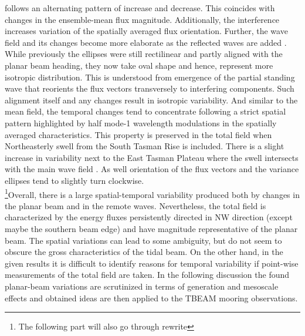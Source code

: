 \documentclass[12pt]{article}
\begin{document}
follows an alternating pattern of increase and decrease. This coincides with changes in the 
ensemble-mean flux magnitude. Additionally, the interference increases variation of the spatially 
averaged flux orientation. Further, the wave field and its changes 
become more elaborate as the reflected waves are added . While 
previously the ellipses were still rectilinear and partly aligned with the planar beam heading, 
they now take oval shape and hence, represent more isotropic distribution. This is understood 
from emergence of the partial standing wave that reorients the flux vectors transversely to 
interfering components. Such alignment itself and any changes result in isotropic 
variability. And similar to the mean field, the temporal changes tend to concentrate 
following a strict spatial pattern highlighted by half mode-1 wavelength modulations in the 
spatially averaged 
characteristics. This property is preserved in the total field when Northeasterly swell from the 
South 
Tasman Rise is included. There is a slight increase in variability next to the East Tasman Plateau 
where the swell intersects with the main wave field . As well 
orientation of the flux vectors and the variance ellipses tend to slightly turn clockwise.\\

\footnote{The following part will also go through rewrite}Overall, 
there is a large spatial-temporal variability produced both by changes in the planar beam and in 
the remote waves. Nevertheless, the total field is characterized by the energy fluxes persistently 
directed in NW direction (except maybe the southern beam edge) and have magnitude representative of 
the planar beam. The spatial variations can lead to some ambiguity, but do not seem to obscure the 
gross characteristics of the tidal beam. On the other hand, in the given results it is difficult to 
identify reasons for temporal variability if point-wise measurements of the total field are taken. 
In the following discussion the found planar-beam variations are scrutinized in terms of generation 
and mesoscale effects and obtained ideas are then applied to the TBEAM mooring observations. 

\end{document}
